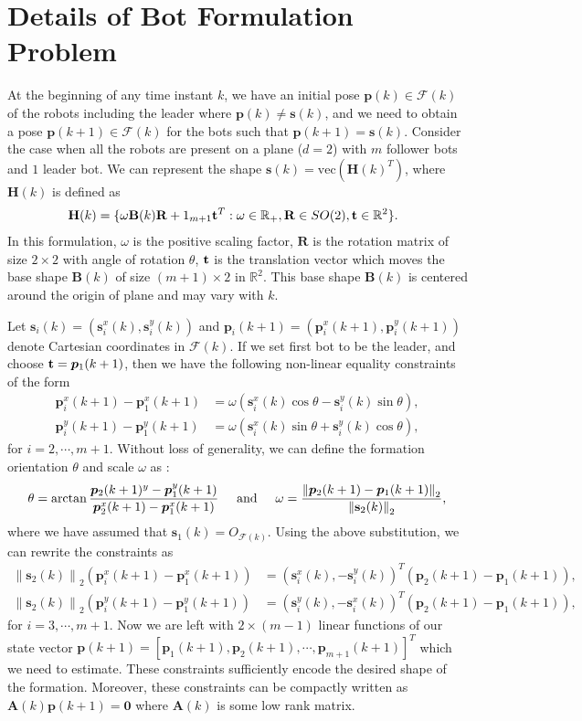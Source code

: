 \documentclass[draftcls,onecolumn,12pt]{IEEEtran}
\theoremstyle{plain}
\def\R{\Rn}
\def\B{\mathbf{B}}
\def\R{\mathbf{R}}
\def\Rn{\mathbb{R}}
\def\A{\mathbf{A}}
\def\p{\boldsymbol{p}}
\def\H{\mathbf{H}}
\def\s{\mathbf{s}}
\providecommand{\norm}[1]{\left\|#1\right\|}
\theoremstyle{plain}
\theoremstyle{remark}
\begin{document}
\section{Details of Bot Formulation Problem}\label{bot_form}
At the beginning of any time instant $k$, we have an initial pose $\p(k)\in\mathcal{F}(k)$ of the robots including the leader where $\p(k) \neq \s(k) $, and we need to obtain a pose $\p(k+1) \in \mathcal{F}(k)$ for the bots such that $\p(k+1) = \s(k) $. 
Consider the case when all the robots are present on a plane ($d=2$) with $m$ follower bots and $1$ leader bot. We can represent the shape $\s(k)=\text{vec}{(\H(k)^T)}$, where $\H(k)$ is defined as
\begin{align}\nonumber
\!\!\!\!\H(k)  = \lbrace \omega \B(k)\R + 1_{m+1}\t^{T}  : \omega \in \Rn_{+}, \R \in SO(2), \t \in \Rn^2 \rbrace.
\end{align} 
In this formulation, $\omega$ is the positive scaling factor, $\R$ is the rotation matrix of size $2\times2$ with angle of rotation $\theta$, $\mathbf{t}$ is the translation vector which moves the base shape $\B(k)$ of size $(m+1)\times2$ in $\Rn^2$. This base shape $\B(k)$ is centered around the origin of plane and may vary with $k$.  

Let $\s_i(k) = (\s_i^x(k), \s_i^y(k))$ and $\p_i(k+1) = (\p_i^x(k+1),\p_i^y(k+1))$ denote Cartesian coordinates in $\mathcal{F}(k)$. If we set first bot to be the leader, and choose $\t = \p_1(k+1)$, then we have the following non-linear equality constraints of the form 
\begin{align}
\p_i^x(k+1) - \p_1^x(k+1) &= \omega (\s_i^x(k) \cos\theta - \s_i^y(k) \sin \theta),\nonumber \\
\p_i^y(k+1) - \p_1^y(k+1) &= \omega (\s_i^x(k) \sin\theta + \s_i^y(k) \cos \theta) ,
\end{align}
for $i = 2, \cdots, m+1$. Without loss of generality, we can define the formation orientation $\theta$ and scale $\omega$ as :
\begin{align}
\theta = \arctan \frac{\p_2(k+1)^y - \p_1^y(k+1)}{\p_2^x(k+1) - \p_1^x(k+1)} \hspace{0.5cm} \text{and}  \hspace{0.5cm} \omega = \frac{\norm{\p_2(k+1) - \p_1(k+1)}_2}{\norm{\s_2(k)}_2},
\end{align}
where we have assumed that $\s_1(k) = O_{\mathcal{F}(k)}$. Using the above substitution, we can rewrite the constraints as 
\begin{align}
\norm{\s_2(k)}_2(\p_i^x(k+1) - \p_1^x(k+1)) &= (\s_i^x(k),-\s_i^y(k))^T (\p_2(k+1) - \p_1(k+1)), \nonumber \\
\norm{\s_2(k)}_2(\p_i^y(k+1) - \p_1^y(k+1)) &= (\s_i^y(k),-\s_i^x(k))^T (\p_2(k+1) - \p_1(k+1)),
\end{align}
for $i = 3,\cdots,m+1$. Now we are left with $2\times(m-1)$ linear functions of our state vector $\p(k+1) = [\p_1(k+1), \p_2(k+1), \cdots, \p_{m+1}(k+1)]^T$ which we need to estimate. These constraints sufficiently encode the desired shape of the formation. Moreover, these constraints can be compactly written as $\A(k) \p(k+1) = \textbf{0}$ where $\A(k)$ is some low rank matrix. 


\end{document}
